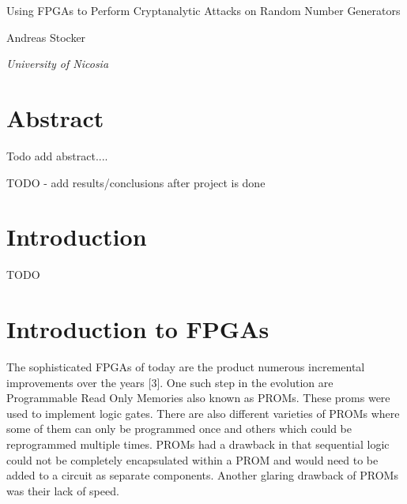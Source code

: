 \documentclass{article}
\begin{document}
    \begin{center}
    \end{center}
    
    \addvspace{20mm}
        
    \begin{center}
        \huge Using FPGAs to Perform Cryptanalytic Attacks on Random Number Generators
    \end{center}
    
    \begin{center}
    \end{center}
       
    \begin{center}
        \large Andreas Stocker
    \end{center}
    
    \begin{center}
        \small \emph {University of Nicosia}
    \end{center}

    \addvspace{15mm}

    \section*{Abstract}

    Todo add abstract....
    
    TODO - add results/conclusions after project is done

    \section{Introduction}

    TODO

    \break

    \section{Introduction to FPGAs}

    The sophisticated FPGAs of today are the product numerous incremental improvements
    over the years [3]. One such step in the evolution are Programmable Read Only Memories
    also known as PROMs. These proms were used to implement logic gates. There are also
    different varieties of PROMs where some of them can only be programmed once and
    others which could be reprogrammed multiple times. PROMs had a drawback in that
    sequential logic could not be completely encapsulated within a PROM and would need
    to be added to a circuit as separate components. Another glaring drawback of PROMs was
    their lack of speed.
\end{document}
